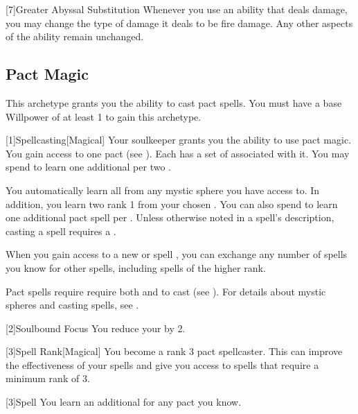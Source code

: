         [7]{Greater Abyssal Substitution} Whenever you use an ability that deals damage, you may change the type of damage it deals to be fire damage.
        Any other aspects of the ability remain unchanged.

    \subsection{Pact Magic}
        This archetype grants you the ability to cast pact spells.
        You must have a base Willpower of at least 1 to gain this archetype.

        [1]{Spellcasting}[Magical]
        Your soulkeeper grants you the ability to use pact magic.
        You gain access to one pact  (see ).
        Each  has a set of  associated with it.
        You may spend  to learn one additional  per two .

        You automatically learn all  from any mystic sphere you have access to.
        In addition, you learn two rank 1  from your chosen .
        You can also spend  to learn one additional pact spell per .
        Unless otherwise noted in a spell's description, casting a spell requires a .

        When you gain access to a new  or spell ,
            you can exchange any number of spells you know for other spells,
            including spells of the higher rank.

        Pact spells require require both  and  to cast (see ).
        For details about mystic spheres and casting spells, see .

        [2]{Soulbound Focus} You reduce your  by 2.

        [3]{Spell Rank}[Magical] You become a rank 3 pact spellcaster.
        This can improve the effectiveness of your spells and give you access to spells that require a minimum rank of 3.

        [3]{Spell} You learn an additional  for any pact  you know.

